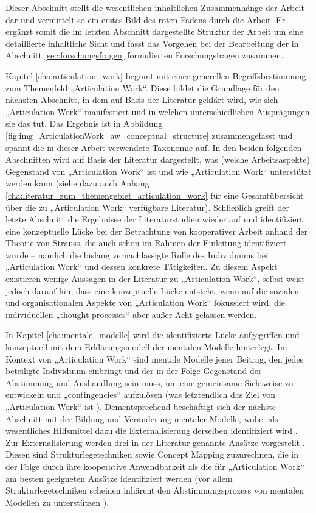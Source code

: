 Dieser Abschnitt stellt die wesentlichen inhaltlichen Zusammenhänge der Arbeit dar und vermittelt so ein erstes Bild des roten Fadens durch die Arbeit. Er ergänzt somit die im letzten Abschnitt dargestellte Struktur der Arbeit um eine detaillierte inhaltliche Sicht und fasst das Vorgehen bei der Bearbeitung der in Abschnitt \ref{sec:forschungsfragen} formulierten Forschungsfragen zusammen.

Kapitel \ref{cha:articulation_work} beginnt mit einer generellen Begriffsbestimmung zum Themenfeld „Articulation Work“. Diese bildet die Grundlage für den nächsten Abschnitt, in dem auf Basis der Literatur geklärt wird, wie sich „Articulation Work“ manifestiert und in welchen unterschiedlichen Ausprägungen sie das tut. Das Ergebnis ist in Abbildung \ref{fig:img_ArticulationWork_aw_conceptual_structure} zusammengefasst und spannt die in dieser Arbeit verwendete Taxonomie auf. In den beiden folgenden Abschnitten wird auf Basis der Literatur dargestellt, was (welche Arbeitsaspekte) Gegenstand von „Articulation Work“ ist und wie „Articulation Work“ unterstützt werden kann (siehe dazu auch Anhang \ref{cha:literatur_zum_themengebiet_articulation_work} für eine Gesamtübersicht über die zu „Articulation Work“ verfügbare Literatur). Schließlich greift der letzte Abschnitt die Ergebnisse der Literaturstudien wieder auf und identifiziert eine konzeptuelle Lücke bei der Betrachtung von kooperativer Arbeit anhand der Theorie von Strauss, die auch schon im Rahmen der Einleitung identifiziert wurde  -- nämlich die bislang vernachlässigte Rolle des Individuums bei „Articulation Work“ und dessen konkrete Tätigkeiten. Zu diesem Aspekt existieren wenige Aussagen in der Literatur zu „Articulation Work“, \citet{Strauss93} selbst weist jedoch darauf hin, dass eine konzeptuelle Lücke entsteht, wenn auf die sozialen und organisationalen Aspekte von „Articulation Work“ fokussiert wird, die individuellen „thought processes“ aber außer Acht gelassen werden.

In Kapitel \ref{cha:mentale_modelle} wird die identifizierte Lücke aufgegriffen und konzeptuell mit dem Erklärungsmodell der mentalen Modelle \citep{Johnson-Laird81} hinterlegt. Im Kontext von „Articulation Work“ sind mentale Modelle jener Beitrag, den jedes beteiligte Individuum einbringt und der in der Folge Gegenstand der Abstimmung und Aushandlung sein muss, um eine gemeinsame Sichtweise zu entwickeln und „contingencies“ aufzulösen (was letztendlich das Ziel von „Articulation Work“ ist \citep{Gerson86}). Dementsprechend beschäftigt sich der nächste Abschnitt mit der Bildung und Veränderung mentaler Modelle, wobei als wesentliches Hilfsmittel dazu die Externalisierung derselben identifiziert wird \citep{Seel91}. Zur Externalisierung werden drei in der Literatur genannte Ansätze vorgestellt \citep{Ifenthaler06}. Diesen sind Strukturlegetechniken \citep{Dann92} sowie Concept Mapping \citep{Novak06} zuzurechnen, die in der Folge durch ihre kooperative Anwendbarkeit als die für „Articulation Work“ am besten geeigneten Ansätze identifiziert werden (vor allem Strukturlegetechniken scheinen inhärent den Abstimmungsprozess von mentalen Modellen zu unterstützen \citep{Groeben00}).

